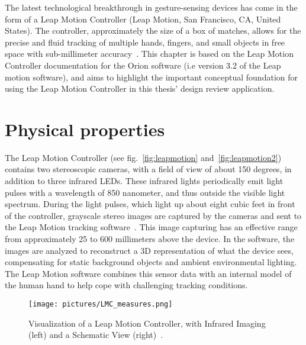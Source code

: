 
The latest technological breakthrough in gesture-sensing devices has come in the form of a Leap Motion Controller (Leap Motion, San Francisco, CA, United States). 
The controller, approximately the size of a box of matches, allows for the precise and fluid tracking of multiple hands, fingers, and small objects in free space with 
sub-millimeter accuracy~\citep{Guna2014}. This chapter is based on the Leap Motion Controller documentation for the Orion software (i.e version 3.2 of the Leap motion software), 
and aims to highlight the important conceptual foundation for using the Leap Motion Controller in this thesis' design review application.

\section{Physical properties}
The Leap Motion Controller (see fig.~\vref{fig:leapmotion} and~\vref{fig:leapmotion2}) contains two stereoscopic cameras, with a field of view of about 150 degrees, 
in addition to three infrared LEDs. These infrared lights periodically emit light pulses with a wavelength of 850 nanometer, and thus outside the visible light spectrum. 
During the light pulses, 
which light up about eight cubic feet in front of the controller, grayscale stereo images are captured by the cameras and sent to the 
Leap Motion tracking software~\citep{LeapMotion2016}. 
This image capturing has an effective range from approximately 25 to 600 millimeters above the device.
In the software, the images are analyzed to reconstruct a 3D representation of what the device sees, 
compensating for static background objects and ambient environmental lighting. 
The Leap Motion software combines this sensor data with an internal model of the human hand to help cope with challenging tracking conditions.


\begin{figure}%
	\texttt{[image: pictures/LMC\_measures.png]}
	\caption[Visualization of a Leap Motion Controller]{Visualization of a Leap Motion Controller, with Infrared Imaging (left) and a Schematic View (right)~\citep{Weichert2013}.}
	\label{fig:leapmotion2}
\end{figure} 

